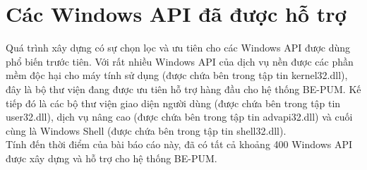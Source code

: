 \section{Các Windows API đã được hỗ trợ}

Quá trình xây dựng có sự chọn lọc và ưu tiên cho các Windows API được dùng phổ biến trước tiên. Với rất nhiều Windows API của dịch vụ nền được các phần mềm độc hại cho máy tính sử dụng (được chứa bên trong tập tin kernel32.dll), đây là bộ thư viện đang được ưu tiên hỗ trợ hàng đầu cho hệ thống BE-PUM. Kế tiếp đó là các bộ thư viện giao diện người dùng (được chứa bên trong tập tin user32.dll), dịch vụ nâng cao (được chứa bên trong tập tin advapi32.dll) và cuối cùng là Windows Shell (được chứa bên trong tập tin shell32.dll).\\

Tính đến thời điểm của bài báo cáo này, đã có tất cả khoảng 400 Windows API được xây dựng và hỗ trợ cho hệ thống BE-PUM.


